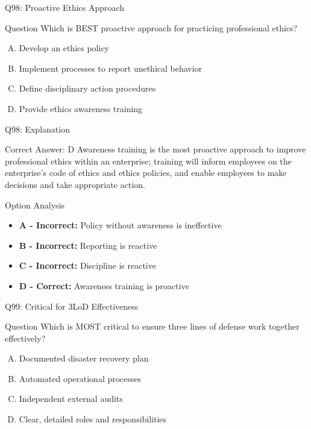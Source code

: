 \documentclass{beamer}
\begin{document}
	\begin{frame}{Q98: Proactive Ethics Approach}
		\begin{block}{Question}
			Which is BEST proactive approach for practicing professional ethics?
		\end{block}
		\begin{enumerate}[(A)]
			\item Develop an ethics policy
			\item Implement processes to report unethical behavior
			\item Define disciplinary action procedures
			\item Provide ethics awareness training
		\end{enumerate}
	\end{frame}
	
	\begin{frame}{Q98: Explanation}
		\begin{block}{Correct Answer: D}
			Awareness training is the most proactive approach to improve professional ethics within an enterprise; training will inform employees on the enterprise's code of ethics and ethics policies, and enable employees to make decisions and take appropriate action.
		\end{block}
		\begin{block}{Option Analysis}
			\begin{itemize}
				\item \textbf{A - Incorrect:} Policy without awareness is ineffective
				\item \textbf{B - Incorrect:} Reporting is reactive
				\item \textbf{C - Incorrect:} Discipline is reactive
				\item \textbf{D - Correct:} Awareness training is proactive
			\end{itemize}
		\end{block}
	\end{frame}
	
	\begin{frame}{Q99: Critical for 3LoD Effectiveness}
		\begin{block}{Question}
			Which is MOST critical to ensure three lines of defense work together effectively?
		\end{block}
		\begin{enumerate}[(A)]
			\item Documented disaster recovery plan
			\item Automated operational processes
			\item Independent external audits
			\item Clear, detailed roles and responsibilities
		\end{enumerate}
	\end{frame}
	
\end{document}
